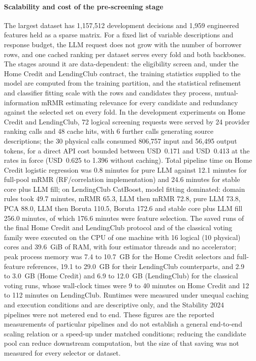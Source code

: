 \documentclass[final,5p,twocolumn]{elsarticle}
\begin{document}
\paragraph{Scalability and cost of the pre-screening stage}
The largest dataset has 1,157,512 development decisions and 1,959 engineered features held as a sparse matrix. For a fixed list of variable descriptions and response budget, the LLM request does not grow with the number of borrower rows, and one cached ranking per dataset serves every fold and both backbones. The stages around it are data-dependent: the eligibility screen and, under the Home Credit and LendingClub contract, the training statistics supplied to the model are computed from the training partition, and the statistical refinement and classifier fitting scale with the rows and candidates they process, mutual-information mRMR estimating relevance for every candidate and redundancy against the selected set on every fold. In the development experiments on Home Credit and LendingClub, 72 logical screening requests were served by 24 provider ranking calls and 48 cache hits, with 6 further calls generating source descriptions; the 30 physical calls consumed 806,757 input and 56,495 output tokens, for a direct API cost bounded between USD~0.171 and USD~0.413 at the rates in force (USD~0.625 to 1.396 without caching). Total pipeline time on Home Credit logistic regression was 0.8 minutes for pure LLM against 12.1 minutes for full-pool mRMR (RF/correlation implementation) and 24.6 minutes for stable core plus LLM fill; on LendingClub CatBoost, model fitting dominated: domain rules took 49.7 minutes, mRMR 65.3, LLM then mRMR 72.8, pure LLM 73.8, PCA 88.0, LLM then Boruta 110.5, Boruta 172.6 and stable core plus LLM fill 256.0 minutes, of which 176.6 minutes were feature selection. The saved runs of the final Home Credit and LendingClub protocol and of the classical voting family were executed on the CPU of one machine with 16 logical (10 physical) cores and 39.6~GiB of RAM, with four estimator threads and no accelerator; peak process memory was 7.4 to 10.7~GB for the Home Credit selectors and full-feature references, 19.1 to 29.0~GB for their LendingClub counterparts, and 2.9 to 3.0~GB (Home Credit) and 6.9 to 12.0~GB (LendingClub) for the classical voting runs, whose wall-clock times were 9 to 40 minutes on Home Credit and 12 to 112 minutes on LendingClub. Runtimes were measured under unequal caching and execution conditions and are descriptive only, and the Stability 2024 pipelines were not metered end to end. These figures are the reported measurements of particular pipelines and do not establish a general end-to-end scaling relation or a speed-up under matched conditions; reducing the candidate pool can reduce downstream computation, but the size of that saving was not measured for every selector or dataset.
\end{document}
